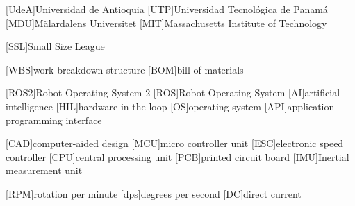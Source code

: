 
[UdeA]{Universidad de Antioquia}
[UTP]{Universidad Tecnológica de Panamá}
[MDU]{Mälardalens Universitet}
[MIT]{Massachusetts Institute of Technology}

[SSL]{Small Size League}

[WBS]{work breakdown structure}
[BOM]{bill of materials}

[ROS2]{Robot Operating System 2}
[ROS]{Robot Operating System}
[AI]{artificial intelligence}
[HIL]{hardware-in-the-loop}
[OS]{operating system}
[API]{application programming interface}

[CAD]{computer-aided design}
[MCU]{micro controller unit}
[ESC]{electronic speed controller}
[CPU]{central processing unit}
[PCB]{printed circuit board}
[IMU]{Inertial measurement unit}

[RPM]{rotation per minute}
[dps]{degrees per second}
[DC]{direct current}

